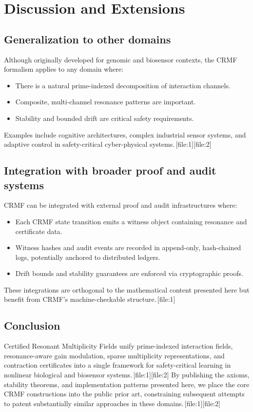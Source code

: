 \documentclass[11pt]{article}
\begin{document}
\section{Discussion and Extensions}

\subsection{Generalization to other domains}

Although originally developed for genomic and biosensor contexts, the CRMF formalism applies to any domain where:
\begin{itemize}[leftmargin=1.5em]
  \item There is a natural prime-indexed decomposition of interaction channels.
  \item Composite, multi-channel resonance patterns are important.
  \item Stability and bounded drift are critical safety requirements.
\end{itemize}
Examples include cognitive architectures, complex industrial sensor systems, and adaptive control in safety-critical cyber-physical systems.\,[file:1][file:2]

\subsection{Integration with broader proof and audit systems}

CRMF can be integrated with external proof and audit infrastructures where:
\begin{itemize}[leftmargin=1.5em]
  \item Each CRMF state transition emits a witness object containing resonance and certificate data.
  \item Witness hashes and audit events are recorded in append-only, hash-chained logs, potentially anchored to distributed ledgers.
  \item Drift bounds and stability guarantees are enforced via cryptographic proofs.
\end{itemize}
These integrations are orthogonal to the mathematical content presented here but benefit from CRMF's machine-checkable structure.\,[file:1]

\subsection{Conclusion}

Certified Resonant Multiplicity Fields unify prime-indexed interaction fields, resonance-aware gain modulation, sparse multiplicity representations, and contraction certificates into a single framework for safety-critical learning in nonlinear biological and biosensor systems.\,[file:1][file:2]
By publishing the axioms, stability theorems, and implementation patterns presented here, we place the core CRMF constructions into the public prior art, constraining subsequent attempts to patent substantially similar approaches in these domains.\,[file:1][file:2]
\end{document}
